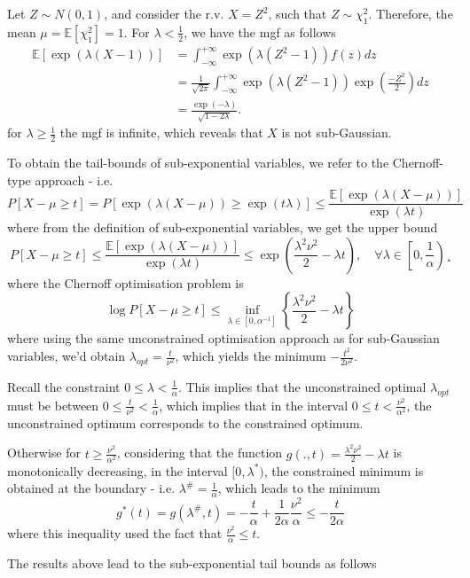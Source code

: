 \documentclass[10pt,handout,english]{beamer}
\newcommand{\E}{\mathbb{E}}
\newcommand{\1}{\mathbbm{1}}
\begin{document}
\begin{frame}
\begin{example}
Let $Z\sim N(0,1)$, and consider the r.v. $X=Z^2$, such that $Z\sim \chi^2_1$. Therefore, the mean $\mu=\E[\chi_1^2]=1$. For $\lambda<\frac{1}{2}$, we have the mgf as follows
\begin{align*}
\E[\exp(\lambda(X-1))]&=\int_{-\infty}^{+\infty}\exp(\lambda(Z^2-1))f(z)dz\\
&=\frac{1}{\sqrt{2\pi}}\int_{-\infty}^{+\infty}\exp(\lambda(Z^2-1))\exp\left(\frac{-Z^2}{2}\right)dz\\
&=\frac{\exp(-\lambda)}{\sqrt{1-2\lambda}}.
\end{align*}
for $\lambda\geq\frac{1}{2}$ the mgf is infinite, which reveals that $X$ is not sub-Gaussian.
\end{example}
\end{frame}
\begin{frame}[allowframebreaks]
To obtain the tail-bounds of sub-exponential variables, we refer to the Chernoff-type approach - i.e.  
\[
P[X-\mu\geq t]=P[\exp(\lambda(X-\mu))\geq\exp(t\lambda)]\leq\frac{\E[\exp(\lambda(X-\mu))]}{\exp(\lambda t)}
\]
where from the definition of sub-exponential variables, we get the upper bound
\[
P[X-\mu\geq t]\leq\frac{\E[\exp(\lambda(X-\mu))]}{\exp(\lambda t)}\leq\exp\left(\frac{\lambda^2\nu^2}{2}-\lambda t\right),\quad\forall \lambda\in\left[0,\frac{1}{\alpha}\right)¸
\]
where the Chernoff optimisation problem is
\[
\log P[X-\mu\geq t]\leq \inf_{\lambda\in[0,\alpha^{-1}]}\left\{\frac{\lambda^2\nu^2}{2}-\lambda t\right\}
\]
where using the same unconstrained optimisation approach as for sub-Gaussian variables, we'd obtain $\lambda_{opt}=\frac{t}{\nu^2}$, which yields the minimum $-\frac{t^2}{2\nu^2}$.

Recall the constraint $0\leq\lambda<\frac{1}{\alpha}$. This implies that the unconstrained optimal $\lambda_{opt}$ must be between $0\leq\frac{t}{\nu^2}<\frac{1}{\alpha}$, which implies that in the interval $0\leq t<\frac{\nu^2}{\alpha^2}$, the unconstrained optimum corresponds to the constrained optimum.

Otherwise for $t\geq \frac{\nu^2}{\alpha^2}$, considering that the function $g(.,t)=\frac{\lambda^2\nu^2}{2}-\lambda t$ is monotonically decreasing, in the interval $[0,\lambda^*)$, the constrained minimum is obtained at the boundary - i.e. $\lambda^\#=\frac{1}{\alpha}$, which leads to the minimum
\[
g^*(t)=g(\lambda^\#,t)=-\frac{t}{\alpha}+\frac{1}{2\alpha}\frac{\nu^2}{\alpha}\leq- \frac{t}{2\alpha}
\]
where this inequality used the fact that $\frac{\nu^2}{\alpha}\leq t$.

The results above lead to the sub-exponential tail bounds as follows
\end{frame}
\end{document}
